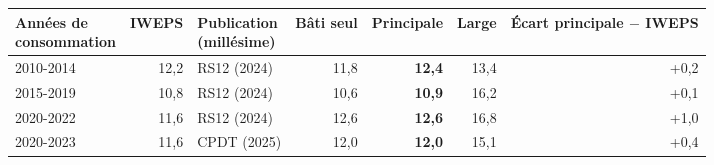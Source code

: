 \begin{tabular}{lrlrrrr}
\toprule
\makecell{Années de\\consommation} & IWEPS & \makecell{Publication\\(millésime)} & Bâti seul & Principale & Large & \makecell{Écart\\principale $-$ IWEPS} \\
\midrule
2010-2014 & 12{,}2 & RS12 (2024) & 11{,}8 & \textbf{12{,}4} & 13{,}4 & +0{,}2 \\
2015-2019 & 10{,}8 & RS12 (2024) & 10{,}6 & \textbf{10{,}9} & 16{,}2 & +0{,}1 \\
2020-2022 & 11{,}6 & RS12 (2024) & 12{,}6 & \textbf{12{,}6} & 16{,}8 & +1{,}0 \\
2020-2023 & 11{,}6 & CPDT (2025) & 12{,}0 & \textbf{12{,}0} & 15{,}1 & +0{,}4 \\
\bottomrule
\end{tabular}
